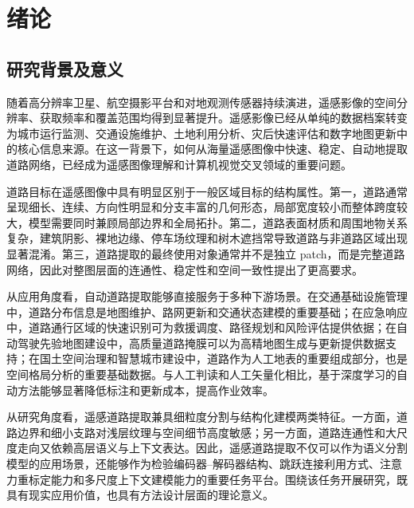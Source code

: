 
\chapter{绪论}
\label{cha:v2-intro}

\section{研究背景及意义}
随着高分辨率卫星、航空摄影平台和对地观测传感器持续演进，遥感影像的空间分辨率、获取频率和覆盖范围均得到显著提升。遥感影像已经从单纯的数据档案转变为城市运行监测、交通设施维护、土地利用分析、灾后快速评估和数字地图更新中的核心信息来源\cite{mnih2013,deepglobe2018}。在这一背景下，如何从海量遥感图像中快速、稳定、自动地提取道路网络，已经成为遥感图像理解和计算机视觉交叉领域的重要问题。

道路目标在遥感图像中具有明显区别于一般区域目标的结构属性。第一，道路通常呈现细长、连续、方向性明显和分支丰富的几何形态，局部宽度较小而整体跨度较大，模型需要同时兼顾局部边界和全局拓扑。第二，道路表面材质和周围地物关系复杂，建筑阴影、裸地边缘、停车场纹理和树木遮挡常导致道路与非道路区域出现显著混淆。第三，道路提取的最终使用对象通常并不是独立 patch，而是完整道路网络，因此对整图层面的连通性、稳定性和空间一致性提出了更高要求。

从应用角度看，自动道路提取能够直接服务于多种下游场景。在交通基础设施管理中，道路分布信息是地图维护、路网更新和交通状态建模的重要基础；在应急响应中，道路通行区域的快速识别可为救援调度、路径规划和风险评估提供依据；在自动驾驶先验地图建设中，高质量道路掩膜可以为高精地图生成与更新提供数据支持；在国土空间治理和智慧城市建设中，道路作为人工地表的重要组成部分，也是空间格局分析的重要基础数据。与人工判读和人工矢量化相比，基于深度学习的自动方法能够显著降低标注和更新成本，提高作业效率。

从研究角度看，遥感道路提取兼具细粒度分割与结构化建模两类特征。一方面，道路边界和细小支路对浅层纹理与空间细节高度敏感；另一方面，道路连通性和大尺度走向又依赖高层语义与上下文表达。因此，遥感道路提取不仅可以作为语义分割模型的应用场景，还能够作为检验编码器--解码器结构、跳跃连接利用方式、注意力重标定能力和多尺度上下文建模能力的重要任务平台。围绕该任务开展研究，既具有现实应用价值，也具有方法设计层面的理论意义。

